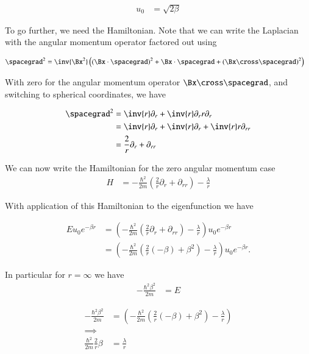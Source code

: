\begin{align}\label{eqn:desaiCh3:701}
u_0 &= \sqrt{2\beta}
\end{align}

To go further, we need the Hamiltonian.  Note that we can write the Laplacian with the angular momentum operator factored out using

\begin{align}\label{eqn:desaiCh3:702}
\spacegrad^2 &= \inv{\Bx^2} \left( (\Bx \cdot \spacegrad)^2 + \Bx \cdot \spacegrad + (\Bx \cross \spacegrad)^2 \right)
\end{align}


With zero for the angular momentum operator $\Bx \cross \spacegrad$, and switching to spherical coordinates, we have

\begin{align*}
\spacegrad^2 
&= \inv{r} \partial_r + \inv{r} \partial_r r \partial_r \\
&= \inv{r} \partial_r 
+ \inv{r} \partial_r
+ \inv{r} r \partial_{rr} \\
&= \frac{2}{r} \partial_r 
+ \partial_{rr} \\
\end{align*}

We can now write the Hamiltonian for the zero angular momentum case
\begin{align}\label{eqn:desaiCh3:703}
H
&= 
-\frac{\hbar^2}{2m} \left( \frac{2}{r} \partial_r + \partial_{rr} \right) - \frac{\lambda}{r}
\end{align}

With application of this Hamiltonian to the eigenfunction we have

\begin{align*}
E u_0 e^{-\beta r} &=
\left( -\frac{\hbar^2}{2m} \left( \frac{2}{r} \partial_r + \partial_{rr} \right) - \frac{\lambda}{r} \right) u_0 e^{-\beta r}  \\
&=
\left( -\frac{\hbar^2}{2m} \left( \frac{2}{r} (-\beta) + \beta^2 \right) - \frac{\lambda}{r} \right) u_0 e^{-\beta r} .
\end{align*}

In particular for $r = \infty$ we have
\begin{align}\label{eqn:desaiCh3:704}
-\frac{\hbar^2 \beta^2 }{2m} &= E
\end{align}

\begin{align*}
-\frac{\hbar^2 \beta^2 }{2m} &= 
\left( -\frac{\hbar^2}{2m} \left( \frac{2}{r} (-\beta) + \beta^2 \right) - \frac{\lambda}{r} \right)  \\
\implies \\
\frac{\hbar^2}{2m} \frac{2}{r} \beta &= \frac{\lambda}{r} 
\end{align*}

